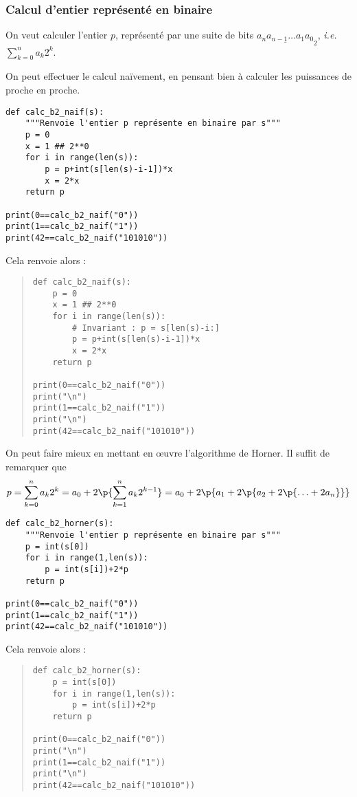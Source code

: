 \subsubsection{Calcul d'entier représenté en binaire}

On veut calculer l'entier $p$, représenté par une suite de bits
$\underline{a_{n}a_{n-1}\ldots a_{1}a_{0}}_{2}$, \emph{i.e.}
$\displaystyle\sum_{k=0}^{n}a_{k}2^{k}$.

On peut effectuer le calcul naïvement, en pensant bien à calculer les puissances de proche en proche. 

\begin{lstlisting}
def calc_b2_naif(s):
    """Renvoie l'entier p représente en binaire par s"""
    p = 0
    x = 1 ## 2**0
    for i in range(len(s)):
        p = p+int(s[len(s)-i-1])*x
        x = 2*x
    return p

print(0==calc_b2_naif("0"))
print(1==calc_b2_naif("1"))
print(42==calc_b2_naif("101010"))
\end{lstlisting}


Cela renvoie alors :
\begin{quote}
\begin{lstlisting}
def calc_b2_naif(s):
    p = 0
    x = 1 ## 2**0
    for i in range(len(s)):
        # Invariant : p = s[len(s)-i:]
        p = p+int(s[len(s)-i-1])*x
        x = 2*x
    return p

print(0==calc_b2_naif("0"))
print("\n")
print(1==calc_b2_naif("1"))
print("\n")
print(42==calc_b2_naif("101010"))
\end{lstlisting}
\end{quote}

On peut faire mieux en mettant en {\oe}uvre l'algorithme de Horner. Il suffit de remarquer que 
\begin{equation*}
  p = \sum_{k=0}^{n}a_{k}2^{k} = a_0 + 2\p{\sum_{k=1}^{n}a_{k}2^{k-1}} = a_0 + 2\p{a_1+2\p{a_2 + 2\p{\ldots + 2a_n}}}
\end{equation*}

\begin{lstlisting}
def calc_b2_horner(s):
    """Renvoie l'entier p représente en binaire par s"""
    p = int(s[0])
    for i in range(1,len(s)):
        p = int(s[i])+2*p
    return p
    
print(0==calc_b2_naif("0"))
print(1==calc_b2_naif("1"))
print(42==calc_b2_naif("101010"))
\end{lstlisting}


Cela renvoie alors :
\begin{quote}
\begin{lstlisting}
def calc_b2_horner(s):
    p = int(s[0])
    for i in range(1,len(s)):
        p = int(s[i])+2*p
    return p
    
print(0==calc_b2_naif("0"))
print("\n")
print(1==calc_b2_naif("1"))
print("\n")
print(42==calc_b2_naif("101010"))
\end{lstlisting}
\end{quote}

